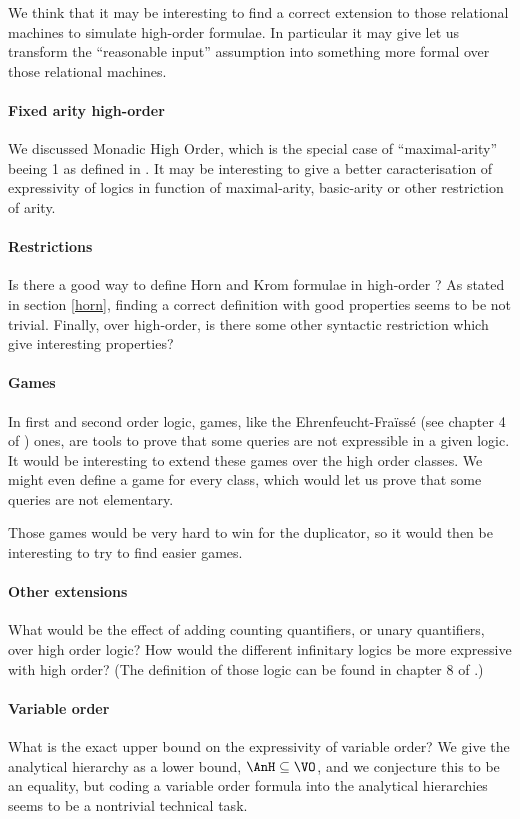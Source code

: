 \documentclass[a4paper,12pt]{article}
\theoremstyle{definition}
\begin{document}
We think that it may be interesting to find a correct extension to
those relational machines to simulate high-order formulae. In
particular it may give let us transform the ``reasonable input''
assumption into something more formal over those relational machines.

\paragraph{Fixed arity high-order}
We discussed Monadic High Order, which is the special case of
``maximal-arity'' beeing 1 as defined in \cite{arity}. It may be
interesting to give a better caracterisation of expressivity of logics
in function of maximal-arity, basic-arity \cite{kolo} or other
restriction of arity.

\paragraph{Restrictions}Is there a good way to define Horn and Krom
formulae in high-order ? As stated in section \ref{horn}, finding a
correct definition with good properties seems to be not trivial. 
Finally, over high-order, is there some other syntactic restriction
which give interesting properties?

\paragraph{Games}
In first and second order logic, games, like the Ehrenfeucht-Fraïssé
(see chapter 4 of \cite{libkin}) ones, are tools to prove that some
queries are not expressible in a given logic. It would be interesting
to extend these games over the high order classes.  We might even define a game
for every class, which would let us prove that some queries are not
elementary.

Those games would be very hard to win for the duplicator, so it would
then be interesting to try to find easier games.

\paragraph{Other extensions}
What would be the effect of adding counting quantifiers, or unary
quantifiers, over high order logic? How would the different
infinitary logics be more expressive with high order? (The definition
of those logic can be found in chapter 8 of \cite{libkin}.)

\paragraph{Variable order}
What is the exact upper bound on the expressivity of variable
order? We give the analytical hierarchy as a lower bound,
$\AnH\subseteq\VO$, and we conjecture this to be an equality, but
coding a variable order formula into the analytical hierarchies seems
to be a nontrivial technical task.
\end{document}

